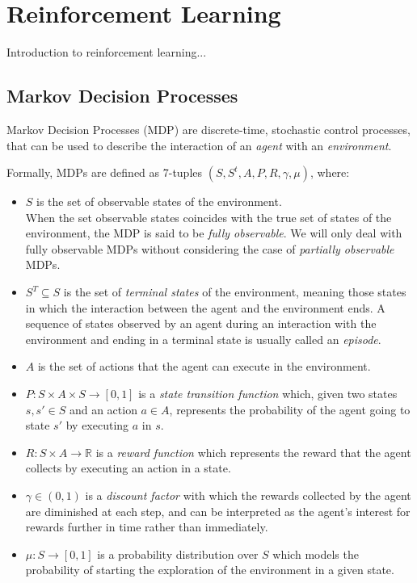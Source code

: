 \section{Reinforcement Learning} \label{s:DRL}

Introduction to reinforcement learning...

\subsection{Markov Decision Processes}
Markov Decision Processes (MDP) are discrete-time, stochastic control 
processes, that can be used to describe the interaction of an \textit{agent} 
with an \textit{environment}.

Formally, MDPs are defined as 7-tuples $(S, S^{t}, A, P, R, \gamma, \mu)$, 
where:
\begin{itemize}
    \item $S$ is the set of observable states of the environment. \\
    When the set observable states coincides with the true set of states of the 
    environment, the MDP is said to be \textit{fully observable}. We will only deal 
    with fully observable MDPs without considering the case of \textit{partially 
    observable} MDPs.

    \item $S^{T} \subseteq S$ is the set of \textit{terminal states} of the 
    environment, meaning those states in which the interaction between the agent and 
    the environment ends. A sequence of states observed by an agent during an 
    interaction with the environment and ending in a terminal state is usually 
    called an \textit{episode}.
 
    \item $A$ is the set of actions that the agent can execute in the environment.
 
    \item $P: S \times A \times S \rightarrow [0,1]$ is a \textit{state transition 
    function} which, given two states $s, s' \in S$ and an action $a \in A$, 
    represents the probability of the agent going to state $s'$ by executing $a$ in 
    $s$.
 
    \item $R: S \times A \rightarrow \mathbb{R}$ is a \textit{reward function} 
    which represents the reward that the agent collects by executing an action in 
    a state. 
    
    \item $\gamma \in (0,1)$ is a \textit{discount factor} with which the rewards 
    collected by the agent are diminished at each step, and can be interpreted as 
    the agent's interest for rewards further in time rather than immediately.
    
    \item $\mu: S \rightarrow [0, 1]$ is a probability distribution over $S$ which 
    models the probability of starting the exploration of the environment in a 
    given state.
\end{itemize}

